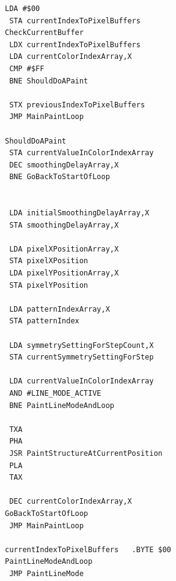 \begin{minipage}[b]{0.33\linewidth}
\begin{lrbox}{\mybox}
\begin{lstlisting}[basicstyle=\ttfamily\tiny]
 LDA #$00
 STA currentIndexToPixelBuffers
CheckCurrentBuffer
 LDX currentIndexToPixelBuffers
 LDA currentColorIndexArray,X
 CMP #$FF
 BNE ShouldDoAPaint

 STX previousIndexToPixelBuffers
 JMP MainPaintLoop

ShouldDoAPaint
 STA currentValueInColorIndexArray
 DEC smoothingDelayArray,X
 BNE GoBackToStartOfLoop


 LDA initialSmoothingDelayArray,X
 STA smoothingDelayArray,X

 LDA pixelXPositionArray,X
 STA pixelXPosition
 LDA pixelYPositionArray,X
 STA pixelYPosition

 LDA patternIndexArray,X
 STA patternIndex

 LDA symmetrySettingForStepCount,X
 STA currentSymmetrySettingForStep

 LDA currentValueInColorIndexArray
 AND #LINE_MODE_ACTIVE
 BNE PaintLineModeAndLoop

 TXA
 PHA
 JSR PaintStructureAtCurrentPosition
 PLA
 TAX

 DEC currentColorIndexArray,X
GoBackToStartOfLoop
 JMP MainPaintLoop

currentIndexToPixelBuffers   .BYTE $00
PaintLineModeAndLoop
 JMP PaintLineMode
\end{lstlisting}
\end{lrbox}%
\scalebox{0.8}{\usebox{\mybox}}
\end{minipage}
\hspace{-0.1cm}
